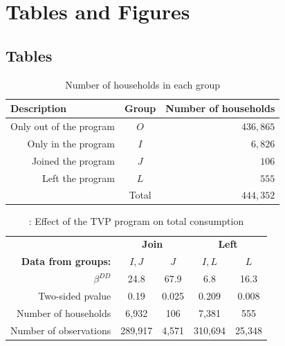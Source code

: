 \section{Tables and Figures}

\subsection{Tables} %


\begin{table}[h]
\centering
\caption{Number of households in each group}
\label{tab:groups}
\begin{tabular}{@{}rcr@{}}
\toprule
\multicolumn{1}{l}{\textbf{Description}} & \multicolumn{1}{l}{\textbf{Group}} & \multicolumn{1}{l}{\textbf{Number of households}} \\ \midrule
Only out of the program & $O$   & $436,865$ \\
Only in the program     & $I$   & $6,826$   \\
Joined the program      & $J$   & $106$     \\
Left the program        & $L$   & $555$     \\ \midrule
                        & Total & $444,352$ \\ \bottomrule
\end{tabular}
\end{table}


\begin{table}[h]
\centering
\caption{: Effect of the TVP program on total consumption}
\label{tab:estimates}
\begin{tabular}{@{}rcccc@{}}
\multicolumn{1}{l}{\textbf{}} & \multicolumn{2}{c}{\textbf{Join}} & \multicolumn{2}{c}{\textbf{Left}} \\
\textbf{Data from groups:}    & \textbf{$I,J$}   & \textbf{$J$}   & \textbf{$I,L$}   & \textbf{$L$}   \\ \midrule
$\beta^{DD}$           & 24.8    & 67.9  & 6.8     & 16.3   \\
Two-sided pvalue       & 0.19    & 0.025 & 0.209   & 0.008  \\ \midrule
Number of households   & 6,932   & 106   & 7,381   & 555    \\
Number of observations & 289,917 & 4,571 & 310,694 & 25,348
\end{tabular}
\end{table}

